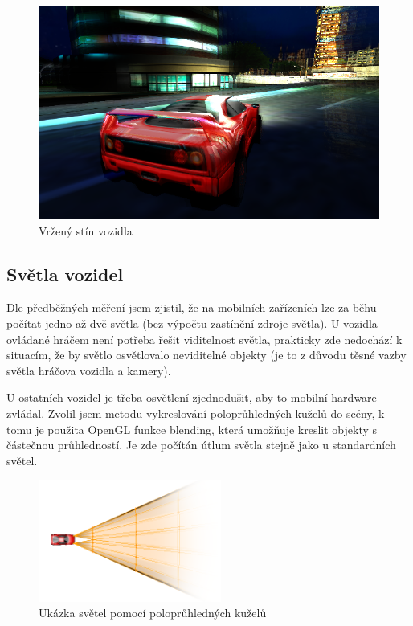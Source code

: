 \documentclass[11pt,twoside,a4paper]{book}
\begin{document}
\begin{center}
\begin{figure}[h]
\includegraphics[width=140mm]{figures/nearshadow.png}
\caption{Vržený stín vozidla}
\end{figure}
\end{center}

\subsection{Světla vozidel}

Dle předběžných měření jsem zjistil, že na mobilních zařízeních lze za běhu počítat jedno až dvě světla (bez výpočtu zastínění zdroje světla). U vozidla ovládané hráčem není potřeba řešit viditelnost světla, prakticky zde nedochází k situacím, že by světlo osvětlovalo neviditelné objekty (je to z důvodu těsné vazby světla hráčova vozidla a kamery).

U ostatních vozidel je třeba osvětlení zjednodušit, aby to mobilní hardware zvládal. Zvolil jsem metodu vykreslování poloprůhledných kuželů do scény, k tomu je použita OpenGL funkce blending, která umožňuje kreslit objekty s částečnou průhledností. Je zde počítán útlum světla stejně jako u standardních světel.

\begin{center}
\begin{figure}[h]
\includegraphics[width=60mm]{figures/carlight.png}
\caption{Ukázka světel pomocí poloprůhledných kuželů}
\end{figure}
\end{center}
\end{document}
